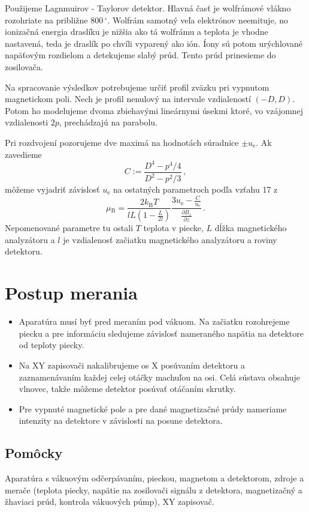 \documentclass[a4paper, 10pt]{article}
\newcommand{\unit}[1]{\ensuremath{\, \mathrm{#1}}}
\newcommand{\di}[1]{\ensuremath{_\mathrm{#1}}}
\begin{document}
Použijeme Lagnmuirov - Taylorov detektor. Hlavná časť je wolfrámové vlákno rozohriate na približne $800\unit{^\circ}$. Wolfrám samotný veľa elektrónov neemituje, no ionizačná energia draslíku je nižšia ako tá wolfrámu a teplota je vhodne nastavená, teda je draslík po chvíli vyparený ako ión. Íony sú potom urýchlované napäťovým rozdielom a detekujeme slabý prúd. Tento prúd prinesieme do zosilovača.

Na spracovanie výsledkov potrebujeme určiť profil zväzku pri vypnutom magnetickom poli. Nech je profil nenulový na intervale vzdialeností $(-D, D)$. Potom ho modelujeme dvoma zbiehavými lineárnymi úsekmi ktoré, vo vzájomnej vzdialenosti $2p$, prechádzajú na parabolu.

Pri rozdvojení pozorujeme dve maximá  na hodnotách súradnice $\pm u\di e$. 
Ak zavedieme 
\begin{equation}
\label{eq:teor:C}
C := \frac{D^4 - p^4/4}{D^2 - p^2/3}\,,
\end{equation}
môžeme vyjadriť závislosť $u\di e$ na ostatných parametroch podľa vzťahu 17 z \cite{ref}
\begin{equation}
\label{eq:teor:ue_na_dBz}
\mu\di B = \frac{2k\di B T}{l L \left(1-\frac{L}{2l}\right)}\frac{3u\di e - \frac{C}{u\di e}}{\frac{\partial{B_z}}{\partial z}}\,.
\end{equation}
Nepomenované parametre tu ostali $T$ teplota v piecke, $L$ dĺžka magnetického analyzátoru a $l$ je vzdialenosť začiatku magnetického analyzátoru a roviny detektoru.
\section*{Postup merania}
\begin{itemize}
\item Aparatúra musí byť pred meraním pod vákuom. Na začiatku rozohrejeme piecku a pre informáciu sledujeme závislosť nameraného napätia na detektore od teploty piecky. 
\item Na XY zapisovači nakalibrujeme os X posúvaním detektoru a zaznamenávaním každej celej otáčky machuľou na osi. Celá sústava obsahuje vlnovec, takže môžeme detektor posúvať otáčaním skrutky. 
\item Pre vypnuté magnetické pole a pre dané magnetizačné prúdy nameriame intenzity na detektore v závislosti na posune detektora.
\end{itemize}
\subsection*{Pomôcky}
Aparatúra s vákuovým odčerpávaním, pieckou, magnetom a detektorom, zdroje a merače (teplota piecky, napätie na zosilovači signálu z detektora, magnetizačný a žhaviaci prúd, kontrola vákuových púmp), XY zapisovač.
\end{document}
